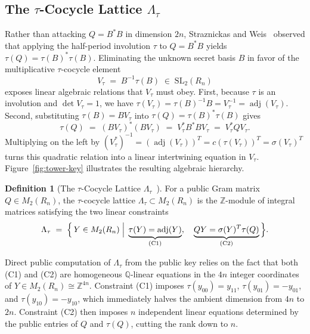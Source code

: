 \documentclass[11pt,a4paper]{article}
\theoremstyle{definition}
\newtheorem{definition}[theorem]{Definition}
\newcommand{\Z}{\mathbb{Z}}
\newcommand{\Q}{\mathbb{Q}}
\newcommand{\Lt}{\Lambda_\tau}
\newcommand{\Vt}{V_\tau}
\newcommand{\adj}{\operatorname{adj}}
\begin{document}
\subsection{The \texorpdfstring{$\tau$}{tau}-Cocycle Lattice \texorpdfstring{$\Lt$}{Lambda\_tau}}
Rather than attacking $Q = B^*B$ in dimension $2n$, Straznickas and Weis~\cite{SW26} observed that applying the half-period involution $\tau$ to $Q = B^*B$ yields $\tau(Q) = \tau(B)^* \tau(B)$. Eliminating the unknown secret basis $B$ in favor of the multiplicative $\tau$-cocycle element
\begin{equation}\label{eq:vtau-def}
  \Vt \;=\; B^{-1}\tau(B) \;\in\; \mathrm{SL}_2(R_n)
\end{equation}
exposes linear algebraic relations that $\Vt$ must obey. First, because $\tau$ is an involution and $\det \Vt = 1$, we have $\tau(\Vt) = \tau(B)^{-1} B = \Vt^{-1} = \adj(\Vt)$. Second, substituting $\tau(B) = B\Vt$ into $\tau(Q) = \tau(B)^*\tau(B)$ gives
\[
  \tau(Q) \;=\; (B\Vt)^*(B\Vt) \;=\; \Vt^* B^* B \Vt \;=\; \Vt^* Q \Vt.
\]
Multiplying on the left by $(\Vt^*)^{-1} = (\adj(\Vt))^T = c(\tau(\Vt))^T = \sigma(\Vt)^T$ turns this quadratic relation into a linear intertwining equation in $\Vt$. Figure~\ref{fig:tower-key} illustrates the resulting algebraic hierarchy.

\begin{definition}[The $\tau$-Cocycle Lattice $\Lt$~\cite{SW26}]\label{def:lt}
For a public Gram matrix $Q \in M_2(R_n)$, the $\tau$-cocycle lattice $\Lt \subset M_2(R_n)$ is the $\Z$-module of integral matrices satisfying the two linear constraints
\begin{equation}\label{eq:lt-constraints}
  \Lt \;=\; \Bigl\{\, Y \in M_2(R_n) \;\Big|\;
  \underbrace{\tau(Y) = \adj(Y)}_{\text{\normalfont (C1)}},\quad
  \underbrace{Q Y = \sigma(Y)^T \tau(Q)}_{\text{\normalfont (C2)}} \,\Bigr\}.
\end{equation}
\end{definition}

Direct public computation of $\Lt$ from the public key relies on the fact that both (C1) and (C2) are homogeneous $\Q$-linear equations in the $4n$ integer coordinates of $Y \in M_2(R_n) \cong \Z^{4n}$. Constraint (C1) imposes $\tau(y_{00}) = y_{11}$, $\tau(y_{01}) = -y_{01}$, and $\tau(y_{10}) = -y_{10}$, which immediately halves the ambient dimension from $4n$ to $2n$. Constraint (C2) then imposes $n$ independent linear equations determined by the public entries of $Q$ and $\tau(Q)$, cutting the rank down to $n$.
\end{document}
